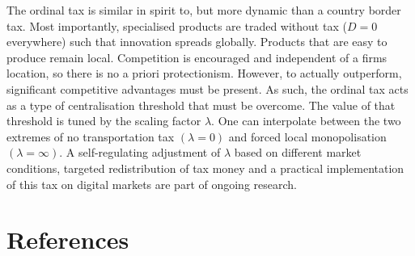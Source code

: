 \documentclass[final,5p,times,twocolumn,11pt,authoryear]{elsarticle}
\numberwithin{equation}{section} %
\begin{document}
The ordinal tax is similar in spirit to, but more dynamic than a country border tax. 
Most importantly, specialised products are traded without tax ($D=0$ everywhere) such that innovation spreads globally. 
Products that are easy to produce remain local. 
Competition is encouraged and independent of a firms location, so there is no a priori protectionism. 
However, to actually outperform, significant competitive advantages must be present. 
As such, the ordinal tax acts as a type of centralisation threshold that must be overcome. 
The value of that threshold is tuned by the scaling factor $\lambda$. 
One can interpolate between the two extremes of no transportation tax $(\lambda=0)$ and forced local monopolisation $(\lambda=\infty)$. 
A self-regulating adjustment of $\lambda$ based on different market conditions, targeted redistribution of tax money and a practical implementation of this tax on digital markets are part of ongoing research. 



\section*{References}


\end{document}
